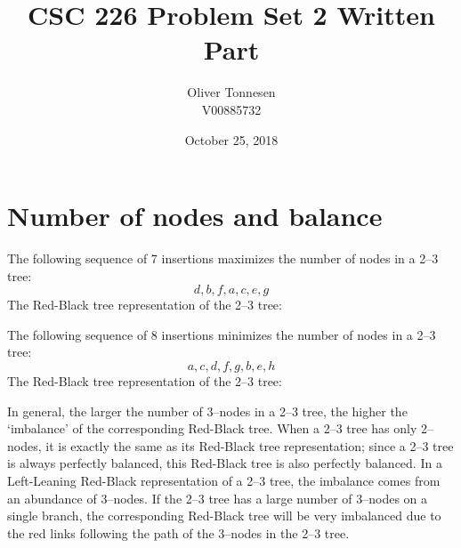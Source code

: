 \documentclass{article}
\title{CSC 226 Problem Set 2 Written Part}
\author{%
	Oliver Tonnesen\\
	V00885732}
\date{October 25, 2018}
\begin{document}
\maketitle
\section{Number of nodes and balance}
	The following sequence of 7 insertions maximizes the number of nodes in a 2--3 tree:
	\[d,b,f,a,c,e,g\]
	The Red-Black tree representation of the 2--3 tree:
	\newline
	\newline
	\newline
	\newline
	The following sequence of 8 insertions minimizes the number of nodes in a 2--3 tree:
	\[a,c,d,f,g,b,e,h\]
	The Red-Black tree representation of the 2--3 tree:
	\newline
	\newline
	\newline
	\newline
	In general, the larger the number of 3--nodes in a 2--3 tree, the higher the `imbalance'
	of the corresponding Red-Black tree. When a 2--3 tree has only 2--nodes, it is exactly
	the same as its Red-Black tree representation; since a 2--3 tree is always perfectly
	balanced, this Red-Black tree is also perfectly balanced. In a Left-Leaning Red-Black
	representation of a 2--3 tree, the imbalance comes from an abundance of 3--nodes. If the
	2--3 tree has a large number of 3--nodes on a single branch, the corresponding Red-Black
	tree will be very imbalanced due to the red links following the path of the 3--nodes in the
	2--3 tree.
\end{document}
